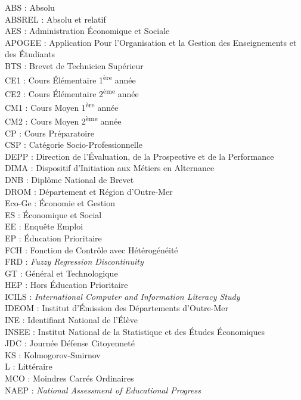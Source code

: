 \documentclass[
]{book}
\begin{document}
ABS : Absolu\\
ABSREL : Absolu et relatif\\
AES : Administration Économique et Sociale\\
APOGEE : Application Pour l'Organisation et la Gestion des Enseignements et des Étudiants\\
BTS : Brevet de Technicien Supérieur\\
CE1 : Cours Élémentaire 1\textsuperscript{ère} année\\
CE2 : Cours Élémentaire 2\textsuperscript{ème} année\\
CM1 : Cours Moyen 1\textsuperscript{ère} année\\
CM2 : Cours Moyen 2\textsuperscript{ème} année\\
CP : Cours Préparatoire\\
CSP : Catégorie Socio-Professionnelle\\
DEPP : Direction de l'Évaluation, de la Prospective et de la Performance\\
DIMA : Dispositif d'Initiation aux Métiers en Alternance\\
DNB : Diplôme National de Brevet\\
DROM : Département et Région d'Outre-Mer\\
Eco-Ge : Économie et Gestion\\
ES : Économique et Social\\
EE : Enquête Emploi\\
EP : Éducation Prioritaire\\
FCH : Fonction de Contrôle avec Hétérogénéité\\
FRD : \emph{Fuzzy Regression Discontinuity}\\
GT : Général et Technologique\\
HEP : Hors Éducation Prioritaire\\
ICILS : \emph{International Computer and Information Literacy Study}\\
IDEOM : Institut d'Émission des Départements d'Outre-Mer\\
INE : Identifiant National de l'Élève\\
INSEE : Institut National de la Statistique et des Études Économiques\\
JDC : Journée Défense Citoyenneté\\
KS : Kolmogorov-Smirnov\\
L : Littéraire\\
MCO : Moindres Carrés Ordinaires\\
NAEP : \emph{National Assessment of Educational Progress}\\
\end{document}
